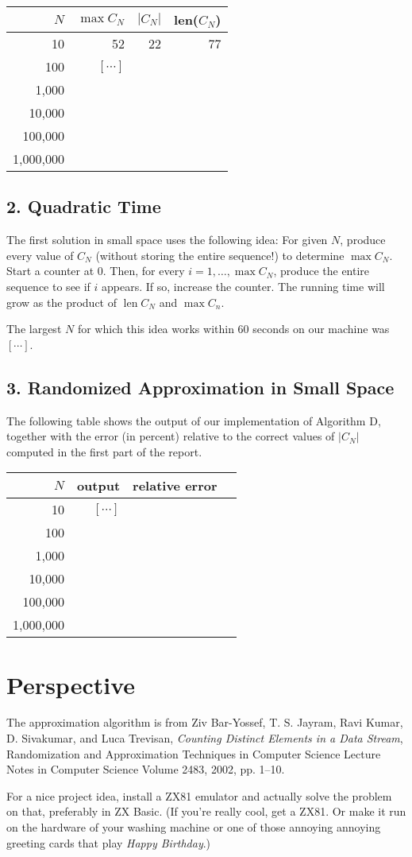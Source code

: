 \documentclass{tufte-handout}
\begin{document}
\medskip
\begin{tabular}{rrrr}
  \toprule
  $N$ & $\max C_N$ & $|C_N|$ & len($C_N$) \\
  \midrule
  10 & 52 & 22 & 77 
  \\
  100 & $[\cdots]$ \\
  1,000 & \\
  10,000 & \\
  100,000 & \\
  1,000,000 & \\
  \bottomrule
\end{tabular}


\subsection{2. Quadratic Time}

The first solution in small space uses the following idea: For given
$N$, produce every value of $C_N$ (without storing the entire
sequence!)
to determine $\max C_N$.
Start a counter at 0.
Then, for every $i=1,\ldots, \max C_N$, produce the entire sequence to
see if $i$ appears.
If so, increase the counter.
The running time will grow as the product of $\operatorname{len}C_N$ and $ \max C_n$.

The largest $N$ for which this idea works within 60 seconds on our
machine was $[\cdots]$.


\subsection{3. Randomized Approximation in Small Space}

The following table shows the output of our implementation of
Algorithm D, together with the error (in percent) relative to the
correct values of $|C_N|$ computed in the first part of the report.

\medskip
\begin{tabular}{rrrr}
  \toprule
  $N$ &   output & relative error \\
  \midrule
  10 & $[\cdots]$ &
  \\
  100 & \\
  1,000 & \\
  10,000 & \\
  100,000 & \\
  1,000,000 & \\
  \bottomrule
\end{tabular}


\newpage
\section{Perspective}

The approximation algorithm is from 
Ziv Bar-Yossef, T. S. Jayram, Ravi Kumar, D. Sivakumar, and Luca Trevisan,
{\em Counting Distinct Elements in a Data Stream}, 
Randomization and Approximation Techniques in Computer Science
Lecture Notes in Computer Science Volume 2483, 2002, pp. 1--10.

For a nice project idea, install a ZX81 emulator and actually solve
the problem on that, preferably in ZX Basic.
(If you're really cool, get a ZX81.
Or make it run on the hardware of your washing machine or one of those
annoying annoying greeting cards that play \emph{Happy Birthday}.)
\end{document}
